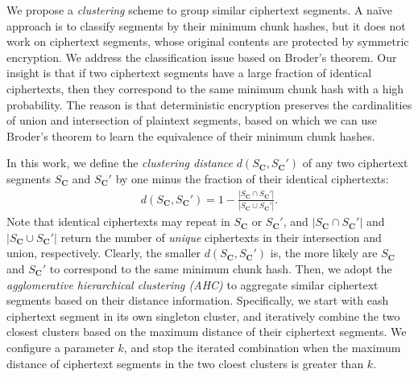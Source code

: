 \documentclass[bachelor]{thesis-uestc}
\begin{document}
We propose a {\em clustering} scheme to group similar ciphertext segments. A na\"{i}ve approach is to classify segments by their minimum chunk hashes, but it does not work on ciphertext segments, whose original contents are protected by symmetric encryption. We address the classification issue based on Broder's theorem.   
Our insight is that if two ciphertext segments have a large fraction of identical ciphertexts, then  they correspond to the same minimum chunk hash with a high probability. The reason is that deterministic encryption preserves the cardinalities of union and intersection of plaintext segments, based on which we can use Broder's theorem to learn the equivalence of their minimum chunk hashes.    

In this work, we define the {\em clustering distance} $d(S_\mathbf{C}, S_\mathbf{C}')$ of any two ciphertext segments $S_\mathbf{C}$ and $S_\mathbf{C}'$ by one minus the fraction of their identical ciphertexts:
\begin{eqnarray}
d(S_\mathbf{C}, S_\mathbf{C}') = 1 - \frac{|S_\mathbf{C} \cap S_\mathbf{C}'|}{|S_\mathbf{C} \cup S_\mathbf{C}'|}. \nonumber
\end{eqnarray}
Note that identical ciphertexts may repeat in $S_\mathbf{C}$ or $S_\mathbf{C}'$, and $|S_\mathbf{C} \cap S_\mathbf{C}'|$ and $|S_\mathbf{C} \cup S_\mathbf{C}'|$ return the number of {\em unique} ciphertexts in their  intersection and union, respectively. Clearly,  the smaller $d(S_\mathbf{C}, S_\mathbf{C}')$ is, the more likely are $S_\mathbf{C}$ and $S_\mathbf{C}'$ to correspond to the same minimum chunk hash. Then, we adopt the {\em agglomerative hierarchical clustering (AHC)} \cite{johnson67} to aggregate similar ciphertext segments based on their distance information.  
Specifically, we start with eash ciphertext segment in its own singleton cluster, and iteratively combine the two closest clusters based on the maximum distance of their ciphertext segments. We configure a parameter $k$, 
and stop the iterated combination when the maximum distance of ciphertext segments in the two cloest
clusters is greater than $k$.
\end{document}
